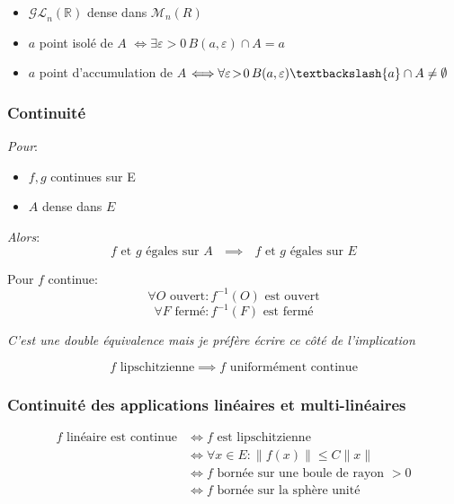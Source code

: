 \documentclass[a4paper,12pt]{report}
\newcommand{\Thm}[2]{\begin{tcolorbox}[colback=white,colframe=Red!60, title=Théorème : #1]#2\end{tcolorbox}}
\newcommand{\Methode}[2]{\begin{tcolorbox}[colback=white, title=Méthode :  #1]#2\end{tcolorbox}}
\def\R{\mathbb{R}}
\newcommand{\ssi}{\Longleftrightarrow}
\begin{document}
\Methode{Exemples à connaitre}{
\begin{itemize}
    \item $\mathcal{GL}_n(\R)$ dense dans $\mathcal{M}_n(R)$
    \item $a$ point isolé de $A$ $\ssi \exists\varepsilon\!>\!0 \, B(a,\varepsilon)\cap A = {a}$ 
    \item $a$ point d'accumulation de $A$ $\ssi \forall\varepsilon\!>\!0 \, B(a,\varepsilon)\textbackslash\{a\}\cap A \neq \emptyset$ 
\end{itemize}
}

\subsubsection{Continuité}

\Thm{Raisonnement par densité}{
\textit{Pour}:
\begin{itemize}
  \item[] $f,g$ continues sur E
  \item[] $A$ dense dans $E$
\end{itemize}
\textit{Alors}:
\[\text{$f$ et $g$ égales sur $A$ $\implies$ $f$ et $g$ égales sur $E$}\]
}

\Thm{Images réciproques}{
Pour $f$ continue:
\[\forall O \text{ ouvert}: f^{-1}(O) \text{ est ouvert}\]
\[\forall F \text{ fermé}: f^{-1}(F) \text{ est fermé}\]

\textit{C'est une double équivalence mais je préfère écrire ce côté de l'implication}
}

\Thm{f lipschitzienne $\implies$ ?}{
\[f \text{ lipschitzienne} \implies f \text{ uniformément continue}\]
}

\subsubsection{Continuité des applications linéaires et multi-linéaires}

\Thm{Caractérisations (4) de la continuité (applications linéaires)}{
\vspace{-5mm}
\begin{align*}
    f  \text{ linéaire est continue} 
    &\ssi f \text{ est lipschitzienne}\\
    &\ssi \forall\!x\!\in\!E: \|f(x)\|\leq C\|x\|\\
    &\ssi f\text{ bornée sur une boule de rayon $>0$}\\ 
    &\ssi f\text{ bornée sur la sphère unité}
\end{align*}
}
\end{document}

